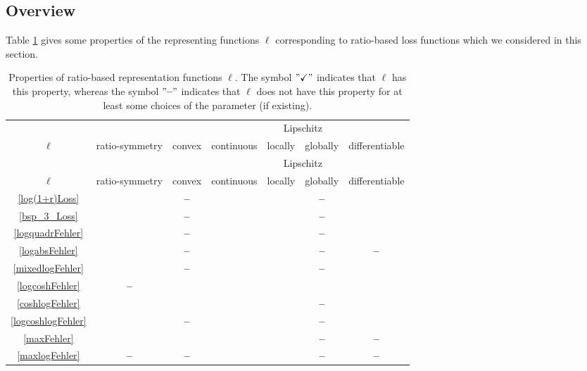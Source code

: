 \documentclass[10pt]{article}
\newcommand{\xmark}{\textbf{--}}
\begin{document}
\subsection{Overview} \label{overview_examples}
Table \ref{TablePropertiesl} gives some properties of the representing functions $\ell$ corresponding to ratio-based loss functions which we considered in this section.
\begin{longtable}[c]{|c||c|c|c|c|c|c|}
	\caption{Properties of ratio-based representation functions $\ell$. The symbol $"\checkmark"$ indicates that $\ell$ has this property, whereas the symbol $"\xmark"$ indicates that $\ell$ does not have this property for at least some choices of the parameter (if existing).} \label{TablePropertiesl} \\
	
	&&&&\multicolumn{2}{c|}{Lipschitz}&\\
	$\ell$ & ratio-symmetry & convex & continuous & locally & globally & differentiable \\
	\hline
	\endfirsthead
	&&&&\multicolumn{2}{c|}{Lipschitz}&\\
	$\ell$ & ratio-symmetry & convex & continuous & locally & globally & differentiable \\
	\hline
	\endhead
	\eqref{log(1+r)Loss} & \checkmark & \xmark & \checkmark & \checkmark & \xmark & \checkmark\\
	\eqref{bsp_3_Loss} & \checkmark & \xmark & \checkmark & \checkmark & \xmark & \checkmark\\
	\eqref{logquadrFehler} & \checkmark & \xmark & \checkmark & \checkmark & \xmark & \checkmark  \\
	\eqref{logabsFehler} & \checkmark & \xmark & \checkmark & \checkmark & \xmark & \xmark \\
	\eqref{mixedlogFehler} & \checkmark &\xmark &\checkmark &\checkmark &\xmark &\checkmark \\
	\eqref{logcoshFehler} & \xmark & \checkmark & \checkmark & \checkmark & \checkmark & \checkmark \\
	\eqref{coshlogFehler} & \checkmark & \checkmark & \checkmark & \checkmark & \xmark & \checkmark \\
	\eqref{logcoshlogFehler} & \checkmark & \xmark & \checkmark & \checkmark & \xmark & \checkmark \\
	\eqref{maxFehler}  & \checkmark &\checkmark & \checkmark& \checkmark & \xmark & \xmark \\
	\eqref{maxlogFehler} & \xmark & \xmark & \checkmark & \checkmark & \xmark & \xmark \\	

\end{longtable}
\end{document}
